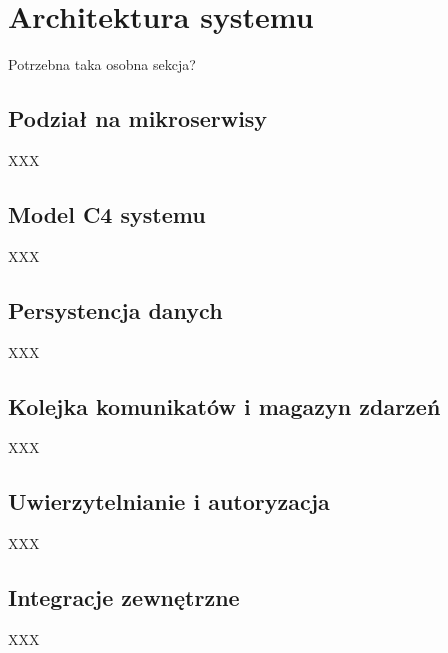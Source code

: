 \clearpage %

\section{Architektura systemu}

Potrzebna taka osobna sekcja?

\subsection{Podział na mikroserwisy}

XXX

\subsection{Model C4 systemu}

XXX

\subsection{Persystencja danych}

XXX

\subsection{Kolejka komunikatów i magazyn zdarzeń}

XXX

\subsection{Uwierzytelnianie i autoryzacja}

XXX

\subsection{Integracje zewnętrzne}

XXX